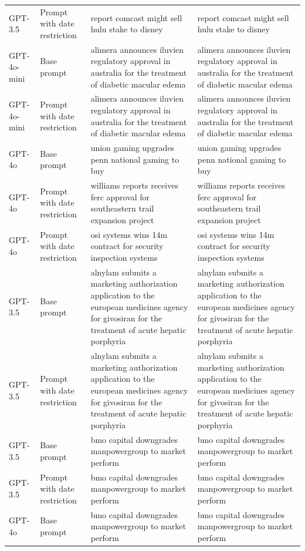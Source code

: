 \begin{longtable}{>{\raggedright\arraybackslash}p{1.4cm}>{\raggedright\arraybackslash}p{1.4cm}>{\raggedright\arraybackslash}p{5.5cm}>{\raggedright\arraybackslash}p{5.5cm}}
GPT-3.5 & Prompt with date restriction & report comcast might sell hulu stake to disney & report comcast might sell hulu stake to disney\\
GPT-4o-mini & Base prompt & alimera announces iluvien regulatory approval in australia for the treatment of diabetic macular edema & alimera announces iluvien regulatory approval in australia for the treatment of diabetic macular edema\\
GPT-4o-mini & Prompt with date restriction & alimera announces iluvien regulatory approval in australia for the treatment of diabetic macular edema & alimera announces iluvien regulatory approval in australia for the treatment of diabetic macular edema\\
GPT-4o & Base prompt & union gaming upgrades penn national gaming to buy & union gaming upgrades penn national gaming to buy\\
GPT-4o & Prompt with date restriction & williams reports receives ferc approval for southeastern trail expansion project & williams reports receives ferc approval for southeastern trail expansion project\\
GPT-4o & Prompt with date restriction & osi systems wins 14m contract for security inspection systems & osi systems wins 14m contract for security inspection systems\\
GPT-3.5 & Base prompt & alnylam submits a marketing authorization application to the european medicines agency for givosiran for the treatment of acute hepatic porphyria & alnylam submits a marketing authorization application to the european medicines agency for givosiran for the treatment of acute hepatic porphyria\\
GPT-3.5 & Prompt with date restriction & alnylam submits a marketing authorization application to the european medicines agency for givosiran for the treatment of acute hepatic porphyria & alnylam submits a marketing authorization application to the european medicines agency for givosiran for the treatment of acute hepatic porphyria\\
GPT-3.5 & Base prompt & bmo capital downgrades manpowergroup to market perform & bmo capital downgrades manpowergroup to market perform\\
GPT-3.5 & Prompt with date restriction & bmo capital downgrades manpowergroup to market perform & bmo capital downgrades manpowergroup to market perform\\
GPT-4o & Base prompt & bmo capital downgrades manpowergroup to market perform & bmo capital downgrades manpowergroup to market perform\\

\end{longtable}
